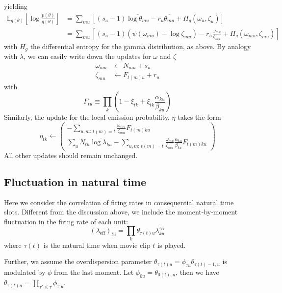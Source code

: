 \documentclass[11pt]{article}
\begin{document}
yielding
\begin{align}
    \mathbb{E}_{q(\theta)} \left[ \log \frac{p(\theta)}{q(\theta)} \right] &=
    \sum_{mu} \left[ (s_u - 1) \overline{\log \theta_{mu}} - r_u \overline{\theta_{mu}} + H_g(\omega_u, \zeta_u) \right] \\
    &= \sum_{mu} \left[ (s_u - 1) (\psi(\omega_{mu}) - \log \zeta_{mu}) - r_u \frac{\omega_{mu}}{\zeta_{mu}} + H_g(\omega_{mu}, \zeta_{mu}) \right]
\end{align}
with $H_g$ the differential entropy for the gamma distribution, as above. By analogy with $\lambda$, we can easily write down the updates for $\omega$ and $\zeta$
\begin{align}
    \omega_{mu} &\leftarrow N_{mu} + s_u \\
    \zeta_{mu} &\leftarrow F_{t(m)u} + r_u
\end{align}
with
\begin{equation}
    F_{tu} \equiv \prod_k \left( 1 - \xi_{tk} + \xi_{tk} \frac{\alpha_{ku}}{\beta_{ku}}\right)
\end{equation}
Similarly, the update for the local emission probability, $\eta$ takes the form
\begin{equation}
    \eta_{tk} \leftarrow
    \begin{pmatrix}
        -\sum_{u, m: \, t(m) = t} \frac{\omega_{mu}}{\zeta_{mu}} F_{t(m)ku} \\
        \sum_u N_{tu} \overline{\log \lambda_{ku}} -
        \sum_{u, m: \, t(m) = t} \frac{\omega_{mu}} {\zeta_{mu}}\frac{\alpha_{ku}}{\beta_{ku}} F_{t(m)ku}
    \end{pmatrix}
\end{equation}
All other updates should remain unchanged.

\subsection{Fluctuation in natural time}
Here we consider the correlation of firing rates in consequential natural time slots. Different from the discussion above, we include the moment-by-moment fluctuation in the firing rate of each unit:
\begin{equation}
    (\lambda_{\mathrm{eff}})_{tu} = \prod_k \theta_{\tau(t)u} \lambda_{ku}^{z_{tk}}
\end{equation}
where $\tau(t)$ is the natural time when movie clip $t$ is played.

Further, we assume the overdispersion parameter $\theta_{\tau(t)u} = \phi_{\tau u} \theta_{\tau(t) - 1, u}$ is modulated by $\phi$ from the last moment. Let $\phi_{0u} = \theta_{0(t), u}$, then we have $\theta_{\tau(t)u} = \prod_{\tau' \le \tau} \phi_{\tau' u}$.
\end{document}
